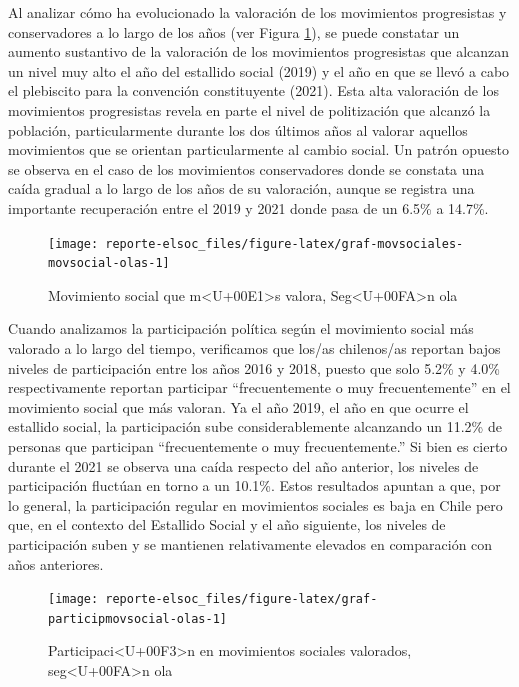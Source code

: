 \documentclass[
  12pt,
]{book}
\begin{document}
Al analizar cómo ha evolucionado la valoración de los movimientos progresistas y conservadores a lo largo de los años (ver Figura \ref{fig:graf-movsociales-movsocial-olas}), se puede constatar un aumento sustantivo de la valoración de los movimientos progresistas que alcanzan un nivel muy alto el año del estallido social (2019) y el año en que se llevó a cabo el plebiscito para la convención constituyente (2021). Esta alta valoración de los movimientos progresistas revela en parte el nivel de politización que alcanzó la población, particularmente durante los dos últimos años al valorar aquellos movimientos que se orientan particularmente al cambio social. Un patrón opuesto se observa en el caso de los movimientos conservadores donde se constata una caída gradual a lo largo de los años de su valoración, aunque se registra una importante recuperación entre el 2019 y 2021 donde pasa de un 6.5\% a 14.7\%.

\begin{figure}

{\centering \texttt{[image: reporte-elsoc\_files/figure-latex/graf-movsociales-movsocial-olas-1]} 

}

\caption{Movimiento social que m<U+00E1>s valora, Seg<U+00FA>n ola}\label{fig:graf-movsociales-movsocial-olas}
\end{figure}

Cuando analizamos la participación política según el movimiento social más valorado a lo largo del tiempo, verificamos que los/as chilenos/as reportan bajos niveles de participación entre los años 2016 y 2018, puesto que solo 5.2\% y 4.0\% respectivamente reportan participar ``frecuentemente o muy frecuentemente'' en el movimiento social que más valoran. Ya el año 2019, el año en que ocurre el estallido social, la participación sube considerablemente alcanzando un 11.2\% de personas que participan ``frecuentemente o muy frecuentemente.'' Si bien es cierto durante el 2021 se observa una caída respecto del año anterior, los niveles de participación fluctúan en torno a un 10.1\%. Estos resultados apuntan a que, por lo general, la participación regular en movimientos sociales es baja en Chile pero que, en el contexto del Estallido Social y el año siguiente, los niveles de participación suben y se mantienen relativamente elevados en comparación con años anteriores.

\begin{figure}

{\centering \texttt{[image: reporte-elsoc\_files/figure-latex/graf-participmovsocial-olas-1]} 

}

\caption{Participaci<U+00F3>n en movimientos sociales valorados, seg<U+00FA>n ola}\label{fig:graf-participmovsocial-olas}
\end{figure}
\end{document}
